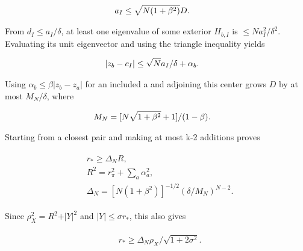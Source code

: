 \begin{gather*}
\begin{aligned}
& a_{I} \le  \sqrt{N(1+\beta ^{2})} D.
\end{aligned}\notag
\end{gather*}

From \(d_{I}\le a_{I}/\delta\), at least one eigenvalue of some exterior
\(H_{b,I}\) is \(\le N a_{I}^{2}/\delta ^{2}\). Evaluating its unit
eigenvector and using the triangle inequality yields

\begin{gather*}
\begin{aligned}
& \vert z_{b}-c_{I}\vert  \le  \sqrt{N} a_{I}/\delta  + \alpha _{b}.
\end{aligned}\notag
\end{gather*}

Using \(\alpha _{b}\le \beta \vert z_{b}-z_{a}\vert\) for an included a
and adjoining this center grows \(D\) by at most \(M_{N}/\delta\), where

\begin{gather*}
\begin{aligned}
& M_{N}=[N \sqrt{1+\beta ^{2}}+1]/(1-\beta ).
\end{aligned}\notag
\end{gather*}

Starting from a closest pair and making at most k-2 additions proves

\begin{gather*}
\begin{aligned}
& r_{*} \ge  \Delta _{N} R, \\
& R^{2}=r_{\pi}^{2}+\sum _{a} \alpha _{a}^{2}, \\
& \Delta _{N}=[N(1+\beta ^{2})]^{-1/2}(\delta /M_{N})^{N-2}.
\end{aligned}\tag{6}
\end{gather*}

Since \(\rho _{X}^{2}=R^{2}+\vert Y\vert ^{2}\) and
\(\vert Y\vert \le \sigma  r_{*}\), this also gives

\begin{gather*}
\begin{aligned}
& r_{*} \ge  \Delta _{N} \rho _{X}/\sqrt{1+2\sigma ^{2}}.
\end{aligned}\tag{7}
\end{gather*}

